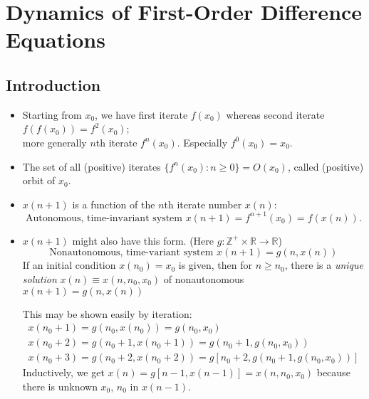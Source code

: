 \chapter{Dynamics of First-Order Difference Equations}
\section{Introduction}
\begin{itemize}
    \item Starting from $x_0$, we have first iterate $f(x_0)$ whereas second iterate $f(f(x_0))=f^2(x_0)$; \\
        more generally $n$th iterate $f^n(x_0)$. Especially $f^0(x_0)=x_0$.
    \item The set of all (positive) iterates $\{f^n(x_0):n\geq 0\}=O(x_0)$, called (positive) orbit of $x_0$.
    \item $x(n+1)$ is a function of the $n$th iterate number $x(n)$:
        \[\text{Autonomous, time-invariant system }x(n+1)=f^{n+1}(x_0)=f(x(n)).\]
    \item $x(n+1)$ might also have this form. (Here $g: \mathbb{Z}^+ \times\mathbb{R}\to\mathbb{R}$)
        \[\text{Nonautonomous, time-variant system }x(n+1)=g(n,x(n))\]
        If an initial condition $x(n_0)=x_0$ is given, then for $n\geq n_0$, there is a \textit{unique solution} $x(n)\equiv x(n,n_0,x_0)$ of nonautonomous $x(n+1)=g(n,x(n))$
        \begin{explanation}
            This may be shown easily by iteration:
            \[
            \begin{array}{l}
                x(n_0+1)=g(n_0,x(n_0))=g(n_0,x_0) \\
                x(n_0+2)=g(n_0+1,x(n_0+1))=g(n_0+1,g(n_0,x_0)) \\
                x(n_0+3)=g(n_0+2,x(n_0+2))=g[n_0+2,g(n_0+1,g(n_0,x_0))]
            \end{array}
        \]
        Inductively, we get $x(n)=g[n-1,x(n-1)]=x(n,n_0,x_0)$ because there is unknown $x_0$, $n_0$ in $x(n-1)$.
        \end{explanation}
\end{itemize}

